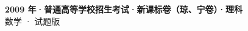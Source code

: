 \documentclass[zihao=-4, a4paper]{ctexart}
\begin{document}
\begin{center}
  {\Large\bfseries 2009 年·普通高等学校招生考试·新课标卷（琼、宁卷）·理科}\\[4pt]
  {\large 数学 · 试题版}
\end{center}
\medskip
{}

\end{document}
